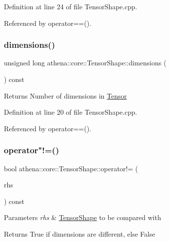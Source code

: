 Definition at line 24 of file Tensor\+Shape.\+cpp.



Referenced by operator==().

\mbox{\label{classathena_1_1core_1_1_tensor_shape_a73f686650f41bd7fa065aa16dfc4529f}} 
\subsubsection{\texorpdfstring{dimensions()}{dimensions()}}
{\footnotesize\ttfamily unsigned long athena\+::core\+::\+Tensor\+Shape\+::dimensions (\begin{DoxyParamCaption}{ }\end{DoxyParamCaption}) const}

\begin{DoxyReturn}{Returns}
Number of dimensions in \mbox{\hyperlink{classathena_1_1core_1_1_tensor}{Tensor}} 
\end{DoxyReturn}


Definition at line 20 of file Tensor\+Shape.\+cpp.



Referenced by operator==().

\mbox{\label{classathena_1_1core_1_1_tensor_shape_acdb5b20f9922cb4d7ee29a868fd05b1b}} 
\subsubsection{\texorpdfstring{operator"!=()}{operator!=()}}
{\footnotesize\ttfamily bool athena\+::core\+::\+Tensor\+Shape\+::operator!= (\begin{DoxyParamCaption}\item[{const \mbox{\hyperlink{classathena_1_1core_1_1_tensor_shape}{Tensor\+Shape}} \&}]{rhs }\end{DoxyParamCaption}) const}


\begin{DoxyParams}{Parameters}
{\em rhs} & \mbox{\hyperlink{classathena_1_1core_1_1_tensor_shape}{Tensor\+Shape}} to be compared with \\
\hline
\end{DoxyParams}
\begin{DoxyReturn}{Returns}
True if dimensions are different, else False 
\end{DoxyReturn}


